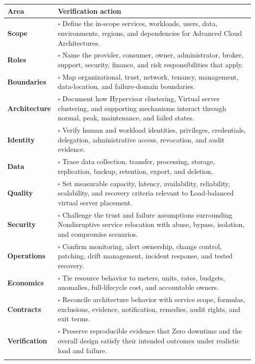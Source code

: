 \documentclass[11pt]{article}
\begin{document}
\begin{longtable}{@{}>{\bfseries\color{Teal}}p{}>{\RaggedRight\arraybackslash}p{}@{}}
\toprule\textbf{Area} & \textbf{Verification action}\\\midrule\endhead
Scope & $\square$ Define the in-scope services, workloads, users, data, environments, regions, and dependencies for Advanced Cloud Architectures. \\\addlinespace[2pt]
Roles & $\square$ Name the provider, consumer, owner, administrator, broker, support, security, finance, and risk responsibilities that apply. \\\addlinespace[2pt]
Boundaries & $\square$ Map organizational, trust, network, tenancy, management, data-location, and failure-domain boundaries. \\\addlinespace[2pt]
Architecture & $\square$ Document how Hypervisor clustering, Virtual server clustering, and supporting mechanisms interact through normal, peak, maintenance, and failed states. \\\addlinespace[2pt]
Identity & $\square$ Verify human and workload identities, privileges, credentials, delegation, administrative access, revocation, and audit evidence. \\\addlinespace[2pt]
Data & $\square$ Trace data collection, transfer, processing, storage, replication, backup, retention, export, and deletion. \\\addlinespace[2pt]
Quality & $\square$ Set measurable capacity, latency, availability, reliability, scalability, and recovery criteria relevant to Load-balanced virtual server placement. \\\addlinespace[2pt]
Security & $\square$ Challenge the trust and failure assumptions surrounding Nondisruptive service relocation with abuse, bypass, isolation, and compromise scenarios. \\\addlinespace[2pt]
Operations & $\square$ Confirm monitoring, alert ownership, change control, patching, drift management, incident response, and tested recovery. \\\addlinespace[2pt]
Economics & $\square$ Tie resource behavior to meters, units, rates, budgets, anomalies, full-lifecycle cost, and accountable owners. \\\addlinespace[2pt]
Contracts & $\square$ Reconcile architecture behavior with service scope, formulas, exclusions, evidence, notification, remedies, audit rights, and exit terms. \\\addlinespace[2pt]
Verification & $\square$ Preserve reproducible evidence that Zero downtime and the overall design satisfy their intended outcomes under realistic load and failure. \\\addlinespace[2pt]
\bottomrule
\end{longtable}
\end{document}
